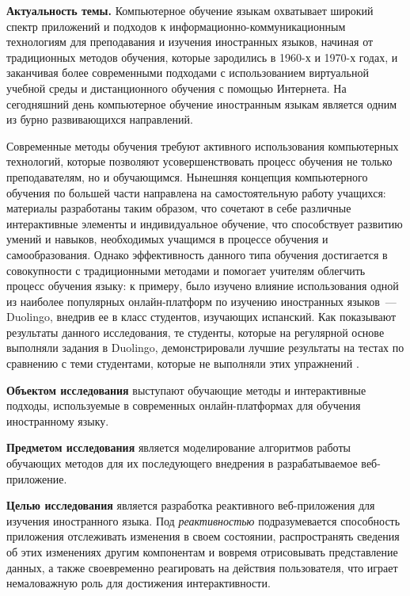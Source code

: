 \Introduction

\textbf{Актуальность темы.} Компьютерное обучение языкам охватывает широкий спектр приложений и подходов к информационно-коммуникационным технологиям для преподавания и изучения иностранных языков, начиная от традиционных методов обучения, которые зародились в 1960-х и 1970-х годах, и заканчивая более современными подходами с использованием виртуальной учебной среды и дистанционного обучения с помощью Интернета. На сегодняшний день компьютерное обучение иностранным языкам является одним из бурно развивающихся направлений.

Современные методы обучения требуют активного использования компьютерных технологий, которые позволяют усовершенствовать процесс обучения не только преподавателям, но и обучающимся. Нынешняя концепция компьютерного обучения по большей части направлена на самостоятельную работу учащихся: материалы разработаны таким образом, что сочетают в себе различные интерактивные элементы и индивидуальное обучение, что способствует развитию умений и навыков, необходимых учащимся в процессе обучения и самообразования. Однако эффективность данного типа обучения достигается в совокупности с традиционными методами и помогает учителям облегчить процесс обучения языку: к примеру, было изучено влияние использования одной из наиболее популярных онлайн-платформ по изучению иностранных языков~--- Duolingo, внедрив ее в класс студентов, изучающих испанский. Как показывают результаты данного исследования, те студенты, которые на регулярной основе выполняли задания в Duolingo, демонстрировали лучшие результаты на тестах по сравнению с теми студентами, которые не выполняли этих упражнений \cite{sushant}.

\textbf{Объектом исследования} выступают обучающие методы и интерактивные подходы, используемые в современных онлайн-платформах для обучения иностранному языку.

\textbf{Предметом исследования} является моделирование алгоритмов работы обучающих методов для их последующего внедрения в разрабатываемое веб-приложение.

\textbf{Целью исследования} является разработка реактивного веб-приложения для изучения иностранного языка. Под \textit{реактивностью} подразумевается способность приложения отслеживать изменения в своем состоянии, распространять сведения об этих изменениях другим компонентам и вовремя отрисовывать представление данных, а также своевременно реагировать на действия пользователя, что играет немаловажную роль для достижения интерактивности.

